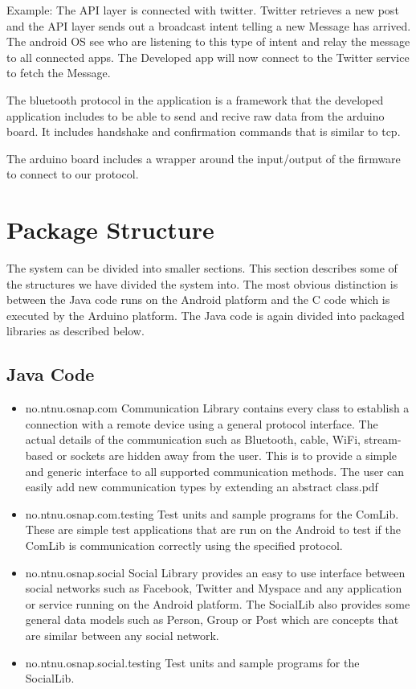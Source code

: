 Example:
The API layer is connected with twitter. Twitter retrieves a new post and the API layer sends out
a broadcast intent telling a new Message has arrived. The android OS see who are listening to this type of intent and relay
the message to all connected apps. The Developed app will now connect to the Twitter service to fetch the Message.

The bluetooth protocol in the application is a framework that the developed application includes
to be able to send and recive raw data from the arduino board. It includes handshake and
confirmation commands that is similar to tcp.

The arduino board includes a wrapper around the input/output of the firmware to connect to our protocol.

\section{Package Structure}
The system can be divided into smaller sections. This section describes some of the structures
we have divided the system into. The most obvious distinction is between the Java code runs
on the Android platform and the C code which is executed by the Arduino platform.
The Java code is again divided into packaged libraries as described below.

\subsection{Java Code}
\begin{itemize}
\item{no.ntnu.osnap.com}\newline
Communication Library contains every class to establish a connection with a remote device using a general protocol interface. The actual details of the communication such as
Bluetooth, cable, WiFi, stream-based or sockets are hidden away from the user. This is to provide a simple and generic interface to all supported communication methods. The
user can easily add new communication types by extending an abstract class.pdf
\item{no.ntnu.osnap.com.testing}\newline
Test units and sample programs for the ComLib. These are simple test applications that are run on the Android to test if the ComLib is communication correctly using the specified
protocol.
\item{no.ntnu.osnap.social}\newline
Social Library provides an easy to use interface between social networks such as Facebook, Twitter and Myspace and any application or service running on the Android platform.
The SocialLib also provides some general data models such as Person, Group or Post which are concepts that are similar between any social network. 
\item{no.ntnu.osnap.social.testing}  \newline
Test units and sample programs for the SocialLib.
\end{itemize}

